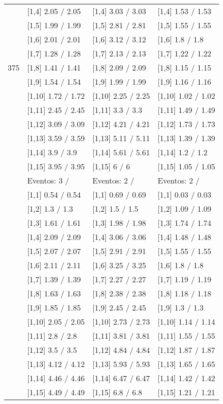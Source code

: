 \begin{table}
\begin{tabular}[t]{llll}
\addlinespace
 & {}[1,4] 2.05  / 2.05 & {}[1,4] 3.03  / 3.03 & {}[1,4] 1.53  / 1.53\\
 & {}[1,5] 1.99  / 1.99 & {}[1,5] 2.81  / 2.81 & {}[1,5] 1.55  / 1.55\\
 & {}[1,6] 2.01  / 2.01 & {}[1,6] 3.12  / 3.12 & {}[1,6] 1.8  / 1.8\\
 & {}[1,7] 1.28  / 1.28 & {}[1,7] 2.13  / 2.13 & {}[1,7] 1.22  / 1.22\\
375 & {}[1,8] 1.41  / 1.41 & {}[1,8] 2.09  / 2.09 & {}[1,8] 1.15  / 1.15\\
\addlinespace
 & {}[1,9] 1.54  / 1.54 & {}[1,9] 1.99  / 1.99 & {}[1,9] 1.16  / 1.16\\
 & {}[1,10] 1.72  / 1.72 & {}[1,10] 2.25  / 2.25 & {}[1,10] 1.02  / 1.02\\
 & {}[1,11] 2.45  / 2.45 & {}[1,11] 3.3  / 3.3 & {}[1,11] 1.49  / 1.49\\
 & {}[1,12] 3.09  / 3.09 & {}[1,12] 4.21  / 4.21 & {}[1,12] 1.73  / 1.73\\
 & {}[1,13] 3.59  / 3.59 & {}[1,13] 5.11  / 5.11 & {}[1,13] 1.39  / 1.39\\
\addlinespace
 & {}[1,14] 3.9  / 3.9 & {}[1,14] 5.61  / 5.61 & {}[1,14] 1.2  / 1.2\\
 & {}[1,15] 3.95  / 3.95 & {}[1,15] 6  / 6 & {}[1,15] 1.05  / 1.05\\
 & Eventos:  3 / & Eventos:  2 / & Eventos:  2 /\\
 & {}[1,1] 0.54  / 0.54 & {}[1,1] 0.69  / 0.69 & {}[1,1] 0.03  / 0.03\\
 & {}[1,2] 1.3  / 1.3 & {}[1,2] 1.5  / 1.5 & {}[1,2] 1.09  / 1.09\\
\addlinespace
 & {}[1,3] 1.61  / 1.61 & {}[1,3] 1.98  / 1.98 & {}[1,3] 1.74  / 1.74\\
 & {}[1,4] 2.09  / 2.09 & {}[1,4] 3.06  / 3.06 & {}[1,4] 1.48  / 1.48\\
 & {}[1,5] 2.07  / 2.07 & {}[1,5] 2.91  / 2.91 & {}[1,5] 1.55  / 1.55\\
 & {}[1,6] 2.11  / 2.11 & {}[1,6] 3.25  / 3.25 & {}[1,6] 1.8  / 1.8\\
 & {}[1,7] 1.39  / 1.39 & {}[1,7] 2.27  / 2.27 & {}[1,7] 1.19  / 1.19\\
\addlinespace
500 & {}[1,8] 1.63  / 1.63 & {}[1,8] 2.38  / 2.38 & {}[1,8] 1.18  / 1.18\\
 & {}[1,9] 1.85  / 1.85 & {}[1,9] 2.45  / 2.45 & {}[1,9] 1.3  / 1.3\\
 & {}[1,10] 2.05  / 2.05 & {}[1,10] 2.73  / 2.73 & {}[1,10] 1.14  / 1.14\\
 & {}[1,11] 2.8  / 2.8 & {}[1,11] 3.81  / 3.81 & {}[1,11] 1.55  / 1.55\\
 & {}[1,12] 3.5  / 3.5 & {}[1,12] 4.84  / 4.84 & {}[1,12] 1.87  / 1.87\\
\addlinespace
 & {}[1,13] 4.12  / 4.12 & {}[1,13] 5.93  / 5.93 & {}[1,13] 1.65  / 1.65\\
 & {}[1,14] 4.46  / 4.46 & {}[1,14] 6.47  / 6.47 & {}[1,14] 1.42  / 1.42\\
 & {}[1,15] 4.49  / 4.49 & {}[1,15] 6.8  / 6.8 & {}[1,15] 1.21  / 1.21\\
\bottomrule
\end{tabular}
\end{table}
